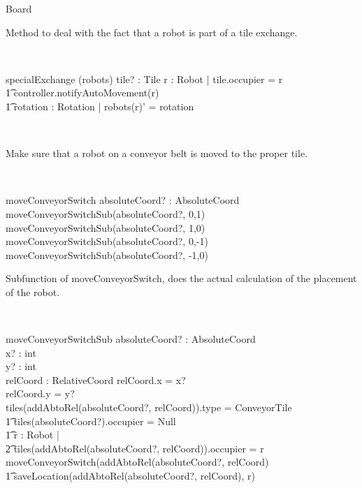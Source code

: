 \documentclass[12pt]{article}
\begin{document}
\begin{class}{Board}
\begin{classcom}
Method to deal with the fact that a robot is part of a tile exchange.
\end{classcom} \\
\begin{schema}{specialExchange}
\Delta (robots)
tile? : Tile
\where
\exists r : Robot | tile.occupier = r \implies \\ \t1
controller.notifyAutoMovement(r) \\ \t1
\exists rotation : Rotation | robots(r)' = rotation
\end{schema} \\
\begin{classcom}
Make sure that a robot on a conveyor belt is moved to the proper tile.
\end{classcom} \\
\begin{schema}{moveConveyorSwitch}
absoluteCoord? : AbsoluteCoord \\
\where
moveConveyorSwitchSub(absoluteCoord?, 0,1) \\
moveConveyorSwitchSub(absoluteCoord?, 1,0) \\
moveConveyorSwitchSub(absoluteCoord?, 0,-1) \\
moveConveyorSwitchSub(absoluteCoord?, -1,0) \\
\end{schema}
\znewpage
\begin{classcom}
Subfunction of moveConveyorSwitch, does the actual calculation of the placement of the robot.
\end{classcom} \\
\begin{schema}{moveConveyorSwitchSub}
absoluteCoord? : AbsoluteCoord \\
x? : int \\
y? : int \\
relCoord : RelativeCoord
\where
relCoord.x = x? \\
relCoord.y = y? \\
\IF tiles(addAbtoRel(absoluteCoord?, relCoord)).type = ConveyorTile \\ \t1
tiles(absoluteCoord?).occupier = Null \\ \t1
\exists r : Robot | \\ \t2 tiles(addAbtoRel(absoluteCoord?, relCoord)).occupier = r \\
\THEN moveConveyorSwitch(addAbtoRel(absoluteCoord?, relCoord)\\ \t1
saveLocation(addAbtoRel(absoluteCoord?, relCoord), r)
\end{schema} \\

\end{class}
\end{document}
